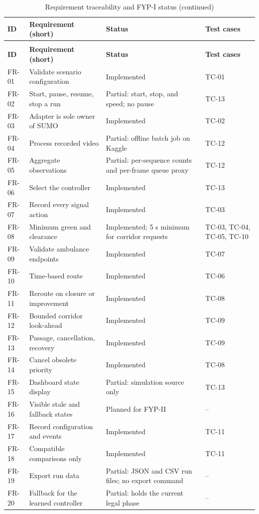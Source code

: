 \begin{longtable}{P{0.08\textwidth}P{0.36\textwidth}P{0.30\textwidth}P{0.14\textwidth}}
\caption{Requirement traceability and FYP-I status}\label{tab:traceability}\\
\toprule
\textbf{ID} & \textbf{Requirement (short)} & \textbf{Status} & \textbf{Test cases}\\
\midrule\endfirsthead
\caption[]{Requirement traceability and FYP-I status (continued)}\\
\toprule
\textbf{ID} & \textbf{Requirement (short)} & \textbf{Status} & \textbf{Test cases}\\
\midrule\endhead
FR-01 & Validate scenario configuration & Implemented & TC-01\\
FR-02 & Start, pause, resume, stop a run & Partial: start, stop, and speed; no pause & TC-13\\
FR-03 & Adapter is sole owner of SUMO & Implemented & TC-02\\
FR-04 & Process recorded video & Partial: offline batch job on Kaggle & TC-12\\
FR-05 & Aggregate observations & Partial: per-sequence counts and per-frame queue proxy & TC-12\\
FR-06 & Select the controller & Implemented & TC-13\\
FR-07 & Record every signal action & Implemented & TC-03\\
FR-08 & Minimum green and clearance & Implemented; 5 s minimum for corridor requests & TC-03, TC-04, TC-05, TC-10\\
FR-09 & Validate ambulance endpoints & Implemented & TC-07\\
FR-10 & Time-based route & Implemented & TC-06\\
FR-11 & Reroute on closure or improvement & Implemented & TC-08\\
FR-12 & Bounded corridor look-ahead & Implemented & TC-09\\
FR-13 & Passage, cancellation, recovery & Implemented & TC-09\\
FR-14 & Cancel obsolete priority & Implemented & TC-08\\
FR-15 & Dashboard state display & Partial: simulation source only & TC-13\\
FR-16 & Visible stale and fallback states & Planned for FYP-II & --\\
FR-17 & Record configuration and events & Implemented & TC-11\\
FR-18 & Compatible comparisons only & Implemented & TC-11\\
FR-19 & Export run data & Partial: JSON and CSV run files; no export command & --\\
FR-20 & Fallback for the learned controller & Partial: holds the current legal phase & --\\
\bottomrule
\end{longtable}

